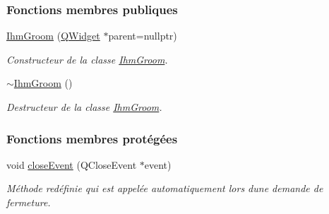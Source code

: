 \subsubsection*{Fonctions membres publiques}
\begin{DoxyCompactItemize}
\item 
\hyperlink{class_ihm_groom_a44887622008d41828025e2b2ccd598a7}{Ihm\+Groom} (\hyperlink{class_q_widget}{Q\+Widget} $\ast$parent=nullptr)
\begin{DoxyCompactList}\small\item\em Constructeur de la classe \hyperlink{class_ihm_groom}{Ihm\+Groom}. \end{DoxyCompactList}\item 
\hyperlink{class_ihm_groom_a89f5e00d9a36d7162da874b2290274e0}{$\sim$\+Ihm\+Groom} ()
\begin{DoxyCompactList}\small\item\em Destructeur de la classe \hyperlink{class_ihm_groom}{Ihm\+Groom}. \end{DoxyCompactList}\end{DoxyCompactItemize}
\subsubsection*{Fonctions membres protégées}
\begin{DoxyCompactItemize}
\item 
void \hyperlink{class_ihm_groom_a8063930f323ce85b679c7598742f325d}{close\+Event} (Q\+Close\+Event $\ast$event)
\begin{DoxyCompactList}\small\item\em Méthode redéfinie qui est appelée automatiquement lors d\textquotesingle{}une demande de fermeture. \end{DoxyCompactList}\end{DoxyCompactItemize}

